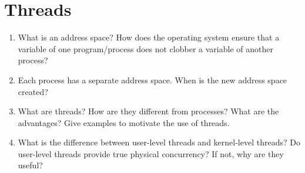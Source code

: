 \section{Threads}
\begin{enumerate}
\item What is an address space? How does the operating system ensure that a variable
of one program/process does not clobber a variable of another process?
\item Each process has a separate address space. When is the new address space created?
\item What are threads? How are they different from processes? What are the advantages?
Give examples to motivate the use of threads.
\item What is the difference between user-level threads and kernel-level threads?
Do user-level threads provide true physical concurrency? If not, why are they useful?
\end{enumerate}

